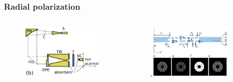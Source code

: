 \documentclass{beamer}
\begin{document}
\begin{frame}
	\frametitle{Radial polarization}
	\begin{columns}
		\begin{column}{0.5\textwidth}
			\begin{figure}[htb]
				\includegraphics[width=\textwidth]{../images/dmg/express_exp_setu.png}\\
			\end{figure}
		\end{column}
		\begin{column}{0.5\textwidth}
			\begin{figure}[htb]
				\includegraphics[width=\textwidth]{../images/dmg/express_siatki.png}\\
			\end{figure}
		\end{column}
	\end{columns}
	{\tiny \cite{Yavorskiy:14}}
		
\end{frame}
\end{document}
